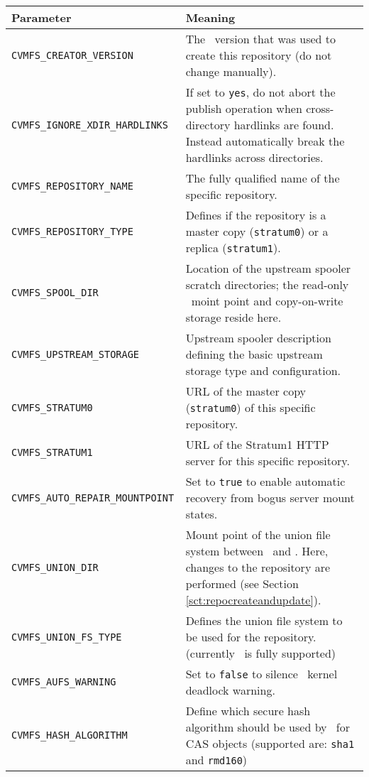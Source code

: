 	\begin{longtable}{lX}
		\toprule
		{\bf\centering Parameter} 			& {\bf\centering Meaning}\\
		\midrule
		\tt CVMFS\_CREATOR\_VERSION			& The \cvmfs\ version that was used to create this repository (do not change manually).\\
		\tt CVMFS\_IGNORE\_XDIR\_HARDLINKS	& If set to \texttt{yes}, do not abort the publish operation when cross-directory hardlinks are found.  Instead automatically break the hardlinks across directories.\\
		\tt CVMFS\_REPOSITORY\_NAME			& The fully qualified name of the specific repository.\\
		\tt CVMFS\_REPOSITORY\_TYPE			& Defines if the repository is a master copy (\texttt{stratum0}) or a replica (\texttt{stratum1}).\\
		\tt CVMFS\_SPOOL\_DIR					& Location of the upstream spooler scratch directories; the read-only \cvmfs\ moint point and copy-on-write storage reside here.\\
		\tt CVMFS\_UPSTREAM\_STORAGE		& Upstream spooler description defining the basic upstream storage type and configuration.\\
		\tt CVMFS\_STRATUM0					& URL of the master copy (\texttt{stratum0}) of this specific repository.\\
		\tt CVMFS\_STRATUM1					& URL of the Stratum1 HTTP server for this specific repository.\\
		\tt CVMFS\_AUTO\_REPAIR\_MOUNTPOINT	& Set to \texttt{true} to enable automatic recovery from bogus server mount states.\\
		\tt CVMFS\_UNION\_DIR					& Mount point of the union file system between \cvmfs\ and \aufs. Here, changes to the repository are performed (see Section \ref{sct:repocreateandupdate}).\\
		\tt CVMFS\_UNION\_FS\_TYPE			& Defines the union file system to be used for the repository. \newline (currently \aufs\ is fully supported)\\
		\tt CVMFS\_AUFS\_WARNING	& Set to \texttt{false} to silence \aufs\ kernel deadlock warning.\\
		\tt CVMFS\_HASH\_ALGORITHM			& Define which secure hash algorithm should be used by \cvmfs\ for CAS objects \newline (supported are: \texttt{sha1} and \texttt{rmd160})\\

\end{longtable}
